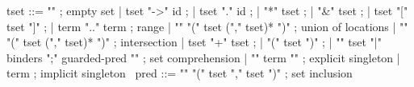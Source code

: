 \begin{syntax}
  tset ::= "\empty" ; empty set
       | tset "->" id ;
       | tset "." id ;
       | "*" tset ;
       | "&" tset ;
       | tset "[" tset "]" ;
       | term ".." term ; range
       | "\union" "(" tset ("," tset)* ")" ; union of locations
       | "\inter" "(" tset ("," tset)* ")" ; intersection
       | tset "+" tset ;
       | "(" tset ")" ;
       | "{" tset "|" binders ";" guarded-pred "}" ; set comprehension
       | { "{" term "}" } ; explicit singleton
       | term ; implicit singleton
       \
  pred ::= {"\subset" "(" tset "," tset ")"} ; set inclusion
\end{syntax}
